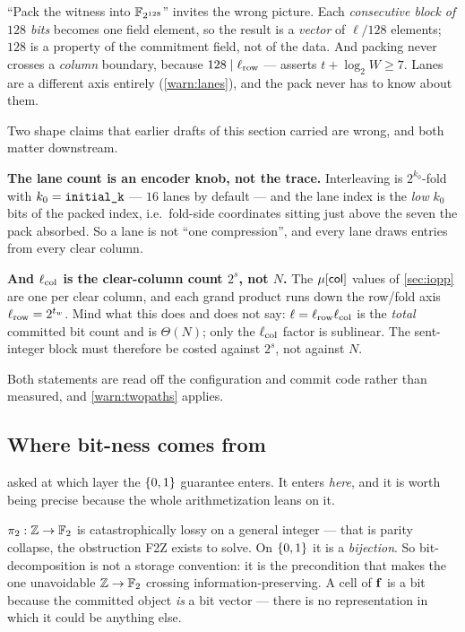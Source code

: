 \begin{remark}
``Pack the witness into $\mathbb{F}_{2^{128}}$'' invites the wrong picture. Each
\emph{consecutive block of $128$ bits} becomes one field element, so the result
is a \emph{vector} of $\ell/128$ elements; $128$ is a property of the
commitment field, not of the data. And packing never crosses a \emph{column}
boundary, because $128\mid\ell_{\mathrm{row}}$ ---  asserts
$t+\log_2 W\geq7$. Lanes are a different axis entirely (\cref{warn:lanes}), and
the pack never has to know about them.
\end{remark}

\begin{warning}
\label{warn:lanes}
Two shape claims that earlier drafts of this section carried are wrong, and both
matter downstream.

\textbf{The lane count is an encoder knob, not the trace.} Interleaving is
$2^{k_0}$-fold with $k_0=\code{initial\_k}$ --- $16$ lanes by default --- and the
lane index is the \emph{low} $k_0$ bits of the packed index, i.e.\ fold-side
coordinates sitting just above the seven the pack absorbed. So a lane is not
``one compression'', and every lane draws entries from every clear column.

\textbf{And $\ell_{\mathrm{col}}$ is the clear-column count $2^{s}$, not $N$.} The
$\mu[\mathsf{col}]$ values of \cref{sec:iopp} are one per clear column, and each
grand product runs down the row/fold axis $\ell_{\mathrm{row}}=2^{t_w}$. Mind what this does
and does not say: $\ell=\ell_{\mathrm{row}}\ell_{\mathrm{col}}$ is the \emph{total} committed bit count
and is $\Theta(N)$; only the $\ell_{\mathrm{col}}$ factor is sublinear.  The sent-integer
block must therefore be costed against $2^s$, not against $N$.

Both statements are read off the configuration and commit code rather than
measured, and \cref{warn:twopaths} applies.
\end{warning}

\subsection{Where bit-ness comes from}

 asked at which layer the $\{0,1\}$ guarantee enters. It enters
\emph{here}, and it is worth being precise because the whole arithmetization
leans on it.

$\pi_2:\mathbb{Z}\to\mathbb{F}_2$ is catastrophically lossy on a general integer --- that is
parity collapse, the obstruction F2Z exists to solve. On $\{0,1\}$ it is a
\emph{bijection}. So bit-decomposition is not a storage convention: it is the
precondition that makes the one unavoidable $\mathbb{Z}\to\mathbb{F}_2$ crossing
information-preserving. A cell of $\mathbf{f}$ is a bit because the committed object
\emph{is} a bit vector --- there is no representation in which it could be
anything else.

